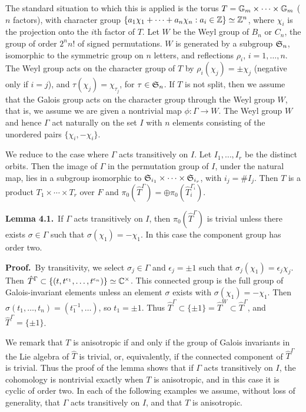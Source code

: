 The standard situation to which this is applied is the
torus $T = {\Bbb G}_m\times\cdots\times {\Bbb G}_m$ ($n$ factors), with
character group $\{a_1\chi_1+\cdots+ a_n\chi_n: a_i\in {\Bbb Z}\}
\simeq{\Bbb Z}^n$, where $\chi_i$ is the projection onto the $i$th
factor of $T$.  Let $W$ be the Weyl group of $B_n$ or $C_n$,
the group of order $2^n n!$ of signed permutations.  $W$ is
generated by a subgroup ${\frak S}_n$, isomorphic to the symmetric group
on $n$ letters, and reflections $\rho_i$, $i=1,\ldots,n$.  The
Weyl group acts on the character group of $T$ by $\rho_i(\chi_j) = \pm \chi_j$
(negative only if $i=j$), and $\tau(\chi_j) = \chi_{\tau_j}$,
for $\tau\in {\frak S}_n$.   If $T$ is not split, then
we assume that the Galois group acts on the character group
through the Weyl group $W$, that is, we assume we are given
a nontrivial map $\phi:\Gamma\to W$.
The Weyl group $W$ and
hence $\Gamma$ act naturally on the set $I$ with $n$ elements
consisting of the unordered pairs $\{\chi_i,-\chi_i\}$.  

We reduce to the case where $\Gamma$ acts transitively on $I$.
Let
$I_1,\ldots, I_r$ be the distinct orbits.  Then the
image of $\Gamma$ in the permutation group of $I$,
under the natural map,
lies in a subgroup isomorphic to ${\frak S}_{i_1}\times\cdots\times 
{\frak S}_{i_r}$,  with $i_j= \# I_j$.
Then $T$ is a product $T_1\times\cdots\times T_r$ over $F$ and 
$\pi_0(\hat T^\Gamma) = \oplus \pi_0(\hat T_i^{\Gamma_i})$.

\bigskip
\noindent
{\bf Lemma 4.1.}\   If $\Gamma$ acts transitively on $I$, then
$\pi_0(\hat T^\Gamma)$ is trivial unless there exists
$\sigma\in \Gamma$ such that $\sigma(\chi_1) =-\chi_1$.  In
this case the component group has order two.

\bigskip
\noindent
{\bf Proof.}\   By transitivity, we select $\sigma_j\in \Gamma$
and $\epsilon_j=\pm 1$ such that $\sigma_j(\chi_1)=\epsilon_j\chi_j$.
Then $\hat T^\Gamma \subset \{(t,t^{\epsilon_1},\ldots,t^{\epsilon_n})\}
\simeq {\Bbb C}^\times$.   This connected group is the full group
of Galois-invariant elements unless an element $\sigma$ exists
with $\sigma(\chi_1)=-\chi_1$.  Then $\sigma(t_1,\ldots,t_n) =
(t_1^{-1},\ldots)$, so $t_1 = {\pm 1}$.  
Thus $\hat T^\Gamma\subset \{\pm1\} = \hat T^W \subset
\hat T^\Gamma$, and $\hat T^\Gamma =\{\pm1\}$.\hfill\x

\smallskip
We remark that $T$ is anisotropic if and only if the group
of Galois invariants in the Lie algebra of $\hat T$ is trivial,
or, equivalently, if the connected component of $\hat T^\Gamma$
is trivial.  Thus the proof of the lemma shows 
that if $\Gamma$ acts transitively
on $I$, the cohomology is nontrivial exactly when $T$ is
anisotropic, and in this case it is cyclic of order two.
In each of the following examples we assume, without
loss of generality, that $\Gamma$ acts transitively on $I$,
and that $T$ is anisotropic.

